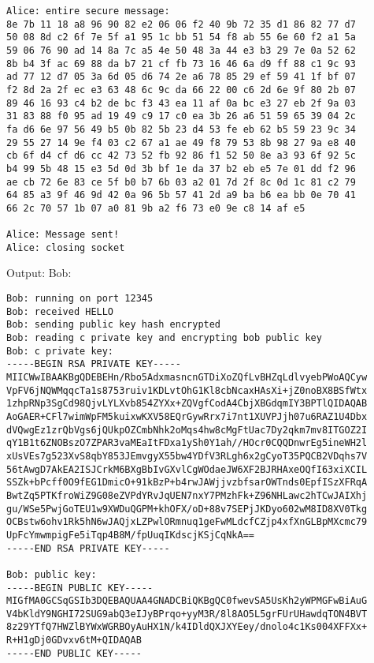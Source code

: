 \documentclass[letterpaper,12pt]{article} \usepackage{fullpage}
\begin{document}
\begin{itemize}
{\begin{verbatim}
Alice: entire secure message: 
8e 7b 11 18 a8 96 90 82 e2 06 06 f2 40 9b 72 35 d1 86 82 77 d7 
50 08 8d c2 6f 7e 5f a1 95 1c bb 51 54 f8 ab 55 6e 60 f2 a1 5a 
59 06 76 90 ad 14 8a 7c a5 4e 50 48 3a 44 e3 b3 29 7e 0a 52 62 
8b b4 3f ac 69 88 da b7 21 cf fb 73 16 46 6a d9 ff 88 c1 9c 93 
ad 77 12 d7 05 3a 6d 05 d6 74 2e a6 78 85 29 ef 59 41 1f bf 07 
f2 8d 2a 2f ec e3 63 48 6c 9c da 66 22 00 c6 2d 6e 9f 80 2b 07 
89 46 16 93 c4 b2 de bc f3 43 ea 11 af 0a bc e3 27 eb 2f 9a 03 
31 83 88 f0 95 ad 19 49 c9 17 c0 ea 3b 26 a6 51 59 65 39 04 2c 
fa d6 6e 97 56 49 b5 0b 82 5b 23 d4 53 fe eb 62 b5 59 23 9c 34 
29 55 27 14 9e f4 03 c2 67 a1 ae 49 f8 79 53 8b 98 27 9a e8 40 
cb 6f d4 cf d6 cc 42 73 52 fb 92 86 f1 52 50 8e a3 93 6f 92 5c 
b4 99 5b 48 15 e3 5d 0d 3b bf 1e da 37 b2 eb e5 7e 01 dd f2 96 
ae cb 72 6e 83 ce 5f b0 b7 6b 03 a2 01 7d 2f 8c 0d 1c 81 c2 79 
64 85 a3 9f 46 9d 42 0a 96 5b 57 41 2d a9 ba b6 ea bb 0e 70 41 
66 2c 70 57 1b 07 a0 81 9b a2 f6 73 e0 9e c8 14 af e5

Alice: Message sent!
Alice: closing socket
            \end{verbatim}
    }

    Output: Bob:
        {\footnotesize
            \singlespacing
            \begin{verbatim}
Bob: running on port 12345
Bob: received HELLO
Bob: sending public key hash encrypted
Bob: reading c private key and encrypting bob public key
Bob: c private key: 
-----BEGIN RSA PRIVATE KEY-----
MIICWwIBAAKBgQDEBEHn/Rbo5AdxmasncnGTDiXoZQfLvBHZqLdlvyebPWoAQCyw
VpFV6jNQWMqqcTa1s8753ruiv1KDLvtOhG1Kl8cbNcaxHAsXi+jZ0noBX8BSfWtx
1zhpRNp3SgCd98QjvLYLXvb854ZYXx+ZQVgfCodA4CbjXBGdqmIY3BPTlQIDAQAB
AoGAER+CFl7wimWpFM5kuixwKXV58EQrGywRrx7i7nt1XUVPJjh07u6RAZ1U4Dbx
dVQwgEz1zrQbVgs6jQUkpOZCmbNhk2oMqs4hw8cMgFtUac7Dy2qkm7mv8ITGOZ2I
qY1B1t6ZNOBszO7ZPAR3vaMEaItFDxa1ySh0Y1ah//HOcr0CQQDnwrEg5ineWH2l
xUsVEs7g523XvS8qbY853JEmvgyX55bw4YDfV3RLgh6x2gCyoT35PQCB2VDqhs7V
56tAwgD7AkEA2ISJCrkM6BXgBbIvGXvlCgWOdaeJW6XF2BJRHAxeOQfI63xiXCIL
SSZk+bPcff0O9fEG1DmicO+91kBzP+b4rwJAWjjvzbfsarOWTnds0EpfISzXFRqA
BwtZq5PTKfroWiZ9G08eZVPdYRvJqUEN7nxY7PMzhFk+Z96NHLawc2hTCwJAIXhj
gu/WSe5PwjGoTEU1w9XWDuQGPM+khOFX/oD+88v7SEPjJKDyo602wM8ID8XV0Tkg
OCBstw6ohv1Rk5hN6wJAQjxLZPwlORmnuq1geFwMLdcfCZjp4xfXnGLBpMXcmc79
UpFcYmwmpigFe5iTqp4B8M/fpUuqIKdscjKSjCqNkA==
-----END RSA PRIVATE KEY-----

Bob: public key: 
-----BEGIN PUBLIC KEY-----
MIGfMA0GCSqGSIb3DQEBAQUAA4GNADCBiQKBgQC0fwevSA5UsKh2yWPMGFwBiAuG
V4bKldY9NGHI72SUG9abQ3eIJyBPrqo+yyM3R/8l8AO5L5grFUrUHawdqTON4BVT
8z29YTfQ7HWZlBYWxWGRBOyAuHX1N/k4IDldQXJXYEey/dnolo4c1Ks004XFFXx+
R+H1gDj0GDvxv6tM+QIDAQAB
-----END PUBLIC KEY-----


\end{verbatim}}
\end{itemize}
\end{document}
